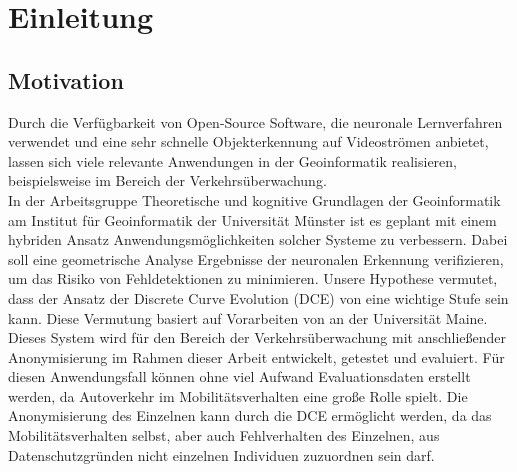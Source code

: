 \chapter{Einleitung}
\label{ch:intro}

\section{Motivation}{ 
	
Durch die Verfügbarkeit von Open-Source Software, die neuronale Lernverfahren verwendet und eine sehr schnelle Objekterkennung auf Videoströmen anbietet, lassen sich viele relevante Anwendungen in der Geoinformatik realisieren, beispielsweise im Bereich der Verkehrsüberwachung. \\
In der Arbeitsgruppe \glqq Theoretische und kognitive Grundlagen der Geoinformatik\grqq{} am Institut für Geoinformatik der Universität Münster ist es geplant mit einem hybriden Ansatz Anwendungsmöglichkeiten solcher Systeme zu verbessern. Dabei soll eine geometrische Analyse Ergebnisse der neuronalen Erkennung verifizieren, um das Risiko von Fehldetektionen zu minimieren. Unsere Hypothese vermutet, dass der Ansatz der Discrete Curve Evolution (DCE) von \citet{Latecki1999a}  eine wichtige Stufe sein kann. Diese Vermutung basiert auf Vorarbeiten von \citet*{Dorr2015} an der Universität Maine.\\

Dieses System wird für den Bereich der Verkehrsüberwachung mit anschließender Anonymisierung im Rahmen dieser Arbeit entwickelt, getestet und evaluiert. Für diesen Anwendungsfall können ohne viel Aufwand Evaluationsdaten erstellt werden, da Autoverkehr im Mobilitätsverhalten eine große Rolle spielt. Die Anonymisierung des Einzelnen kann durch die DCE ermöglicht werden, da das Mobilitätsverhalten selbst, aber auch Fehlverhalten des Einzelnen, aus Datenschutzgründen nicht einzelnen Individuen zuzuordnen sein darf.
}



